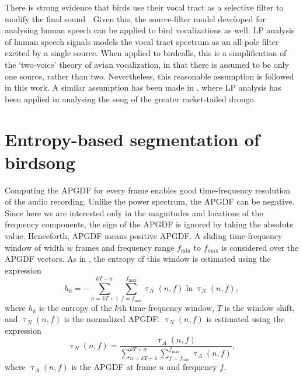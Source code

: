 \documentclass[a4paper]{article}
\begin{document}
There is strong evidence that birds use their vocal tract as a selective filter
to modify the final sound \cite{catchpole}.  Given this, the source-filter model
developed for analysing human speech can be applied to bird vocalizations as
well.  LP analysis of human speech signals models the vocal
tract spectrum as an all-pole filter \cite{makhoul} excited by a single source.
When applied to birdcalls, this is a simplification of the `two-voice' theory of
avian vocalization\cite{catchpole}, in that there is assumed to be only one
source, rather than two. Nevertheless, this reasonable assumption is followed in
this work. A similar assumption has been made in \cite{agnihotri}, where LP
analysis has been applied in analysing the song of the greater racket-tailed
drongo.



\section{Entropy-based segmentation of birdsong}
\label{sec:entropyAlgo}

Computing the APGDF for every frame enables good time-frequency resolution of
the audio recording. Unlike the power spectrum, the APGDF can be negative.
Since here we are interested only in the magnitudes and locations of the
frequency components, the sign of the APGDF is ignored by taking the absolute
value. Henceforth, APGDF means positive APGDF.  A sliding time-frequency window
of width $w$ frames and frequency range $f_{\min}$ to $f_{\max}$ is considered over the
APGDF vectors. As in \cite{wang2013}, the entropy of this window is estimated
using the expression
\begin{equation}
\label{eq:2}
 h_{k}=-\sum_{n=kT+1}^{kT+w}\sum_{f=f_{\min}}^{f_{\max}} \uptau_N(n,f) \ln \uptau_N(n,f),
\end{equation}
where $h_k$ is the entropy of the $k$th time-frequency window, $T$ is the window shift, 
and $\uptau_N(n,f)$ is the normalized
APGDF. $\uptau_N(n,f)$ is estimated using the expression 
\begin{equation}
\label{eq:3}
\uptau_N(n,f)=\frac {\uptau_A(n,f)}
{\sum_{n=kT+1}^{kT+w}\sum_{f=f_{\min}}^{f_{\max}} \uptau_A(n,f)},
\end{equation}
where $\uptau_A(n,f)$ is the APGDF at frame $n$ and frequency $f$.
\end{document}
